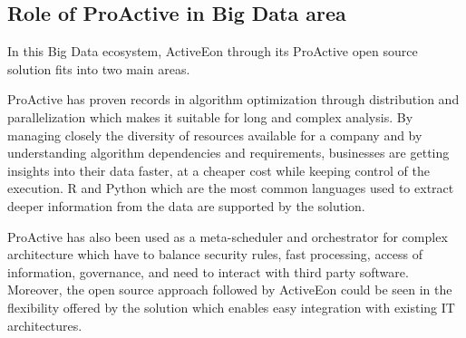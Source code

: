 \documentclass[	DIV=calc,%
							paper=a4,%
							fontsize=11pt,%
							twocolumn]{scrartcl}	 					%
\begin{document}
\subsection*{Role of ProActive in Big Data area}

In this Big Data ecosystem, ActiveEon through its ProActive \cite{ProActive} open source solution fits into two main areas.

ProActive has proven records in algorithm optimization through distribution and parallelization which makes it suitable for long and complex analysis. By managing closely the diversity of resources available for a company and by understanding algorithm dependencies and requirements, businesses are getting insights into their data faster, at a cheaper cost while keeping control of the execution. R and Python which are the most common languages used to extract deeper information from the data are supported by the solution. 

ProActive has also been used as a meta-scheduler and orchestrator for complex architecture which have to balance security rules, fast processing, access of information, governance, and need to interact with third party software. Moreover, the open source approach followed by ActiveEon could be seen in the flexibility offered by the solution which enables easy integration with existing IT architectures.





\end{document}
